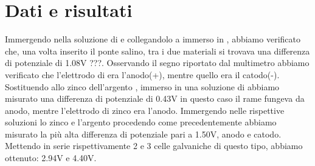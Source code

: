 \section*{Dati e risultati}
Immergendo  nella soluzione di  e collegandolo a  immerso in , abbiamo verificato che, una volta inserito il ponte salino, tra i due materiali si trovava una differenza di potenziale di 1.08V \pn ???. Osservando il segno riportato dal multimetro abbiamo verificato che l'elettrodo di  era l'anodo(+), mentre quello  era il catodo(-).
Sostituendo allo zinco dell'argento , immerso in una soluzione di  abbiamo misurato una differenza di potenziale di 0.43V in questo caso il rame fungeva da anodo, mentre l'elettrodo di zinco era l'anodo.
Immergendo nelle rispettive soluzioni lo zinco e l'argento procedendo come precedentemente abbiamo misurato la più alta differenza di potenziale pari a 1.50V,  anodo e  catodo. Mettendo in serie rispettivamente 2 e 3  celle galvaniche di questo tipo, abbiamo ottenuto: 2.94V e 4.40V.
